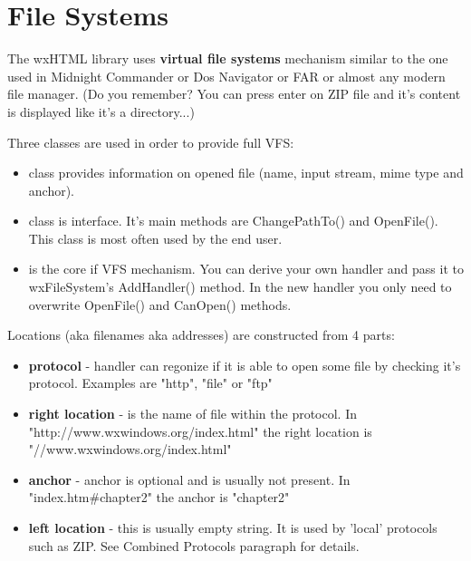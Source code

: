 \section{File Systems}\label{fs}

The wxHTML library uses {\bf virtual file systems} mechanism
similar to the one used in Midnight Commander or Dos Navigator or
FAR or almost any modern file manager. (Do you remember? You can
press enter on ZIP file and it's content is displayed like it's
a directory...)


Three classes are used in order to provide full VFS:

\begin{itemize}
\item {} class provides information
on opened file (name, input stream, mime type and anchor).

\item {} class is interface.
It's main methods are ChangePathTo() and OpenFile(). This class
is most often used by the end user.

\item {} is the core
if VFS mechanism. You can derive your own handler and pass it to
wxFileSystem's AddHandler() method. In the new handler you only need to
overwrite OpenFile() and CanOpen() methods.
\end{itemize}


Locations (aka filenames aka addresses) are constructed from 4 parts:

\begin{itemize}
\item {\bf protocol} - handler can regonize if it is able to open some
file by checking it's protocol. Examples are "http", "file" or "ftp"

\item {\bf right location} - is the name of file within the protocol.
In "http://www.wxwindows.org/index.html" the right location is "//www.wxwindows.org/index.html"

\item {\bf anchor} - anchor is optional and is usually not present.
In "index.htm\#chapter2" the anchor is "chapter2"

\item {\bf left location} - this is usually empty string. 
It is used by 'local' protocols such as ZIP.
See Combined Protocols paragraph for details.
\end{itemize}


